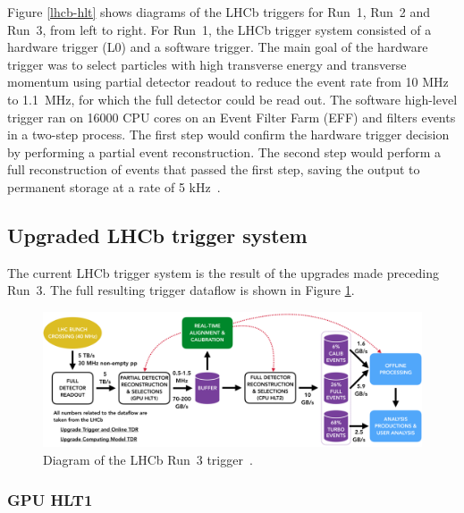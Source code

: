 Figure \ref{lhcb-hlt} shows diagrams of the LHCb triggers for Run~1, Run~2 and Run~3, from left to right. %
For Run~1, the LHCb trigger system consisted of a hardware trigger (L0) and a software trigger. The main goal of the hardware trigger was to select particles with high transverse energy and transverse momentum using partial detector readout to reduce the event rate from 10 MHz to 1.1~MHz, for which the full detector could be read out. The software high-level trigger ran on 16000 CPU cores on an Event Filter Farm (EFF) and filters events in a two-step process. The first step would confirm the hardware trigger decision by performing a partial event reconstruction. The second step would perform a full reconstruction of events that passed the first step, saving the output to permanent storage at a rate of 5 kHz~\cite{LHCb:Head_2014, LHCb:Albrecht_2014}.



\subsection{Upgraded LHCb trigger system} %


The current LHCb trigger system is the result of the upgrades made preceding Run~3. The full resulting trigger dataflow is shown in Figure \ref{lhcb-hlt-run-III}.

\begin{figure}[ht]
    \centering
    \includegraphics[width=1\linewidth]{images/lhcb/hidef_RTA_dataflow_widescreen.png}
    \caption{Diagram of the LHCb Run~3 trigger~\cite{run3-dataflow}.}
    \label{lhcb-hlt-run-III}
\end{figure}


\subsubsection{GPU HLT1}




